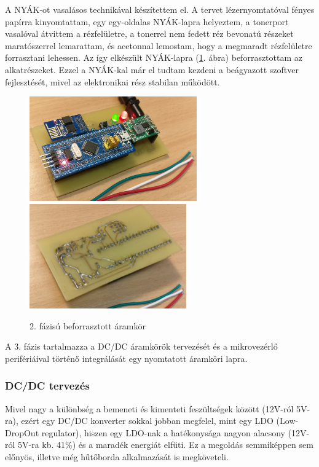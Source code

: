 \documentclass[../main.tex]{subfiles}
\begin{document}
        A NYÁK-ot vasalásos technikával készítettem el. A tervet lézernyomtatóval fényes papírra kinyomtattam, egy egy-oldalas NYÁK-lapra helyeztem, a tonerport vasalóval átvittem a rézfelületre, a tonerrel nem fedett réz bevonatú részeket maratószerrel lemarattam, és acetonnal lemostam, hogy a megmaradt rézfelületre forrasztani lehessen. Az így elkészült NYÁK-lapra (\ref{fig:pcb_v01}. ábra) beforrasztottam az alkatrészeket. Ezzel a NYÁK-kal már el tudtam kezdeni a beágyazott szoftver fejlesztését, mivel az elektronikai rész stabilan működött.
        
        \begin{figure}[h!]
            \centering
                \includegraphics[height=4.5cm]{resources/pcb_res/pcb_v01}
                \includegraphics[height=4.5cm]{resources/pcb_res/pcb_v02}
            \caption{2. fázisú beforrasztott áramkör}
            \label{fig:pcb_v01}
        \end{figure}
        
        A 3. fázis tartalmazza a DC/DC áramkörök tervezését és a mikrovezérlő perifériáival történő integrálását egy nyomtatott áramköri lapra.
    
        
        \subsubsection{DC/DC tervezés}
            Mivel nagy a különbség a bemeneti és kimenteti feszültségek között (12V-ról 5V-ra), ezért egy DC/DC konverter sokkal jobban megfelel, mint egy LDO (Low-DropOut regulator), hiszen egy LDO-nak a hatékonysága nagyon alacsony (12V-ról 5V-ra kb. 41\%) és a maradék energiát elfűti. Ez a megoldás semmiképpen sem előnyös, illetve még hűtőborda alkalmazását is megköveteli. \cite{dcdc_1}\cite{dcdc_2}
            
\end{document}
